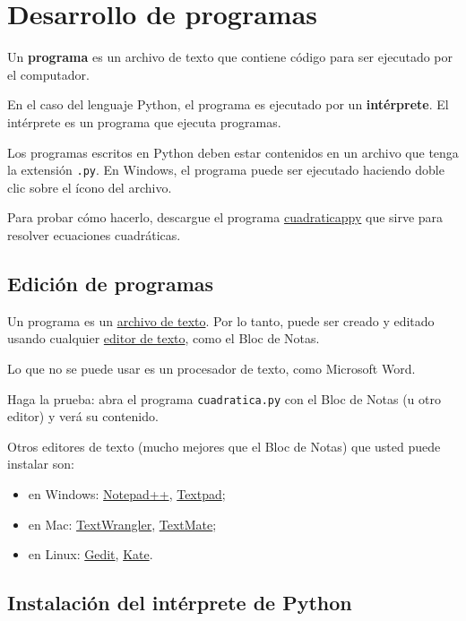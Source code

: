 \section{Desarrollo de programas}

Un \textbf{programa} es un archivo de texto que contiene código para ser
ejecutado por el computador.

En el caso del lenguaje Python, el programa es ejecutado por un
\textbf{intérprete}. El intérprete es un programa que ejecuta programas.

Los programas escritos en Python deben estar contenidos en un archivo
que tenga la extensión \lstinline!.py!. En Windows, el programa puede
ser ejecutado haciendo doble clic sobre el ícono del archivo.

Para probar cómo hacerlo, descargue el programa
\href{../\_static/programas/cuadratica.py}{cuadraticappy} que sirve para
resolver ecuaciones cuadráticas.

\subsection{Edición de programas}

Un programa es un
\href{http://es.wikipedia.org/wiki/Archivo\_de\_texto}{archivo de
texto}. Por lo tanto, puede ser creado y editado usando cualquier
\href{http://es.wikipedia.org/wiki/Editor\_de\_texto}{editor de texto},
como el Bloc de Notas.

Lo que no se puede usar es un procesador de texto, como Microsoft Word.

Haga la prueba: abra el programa \lstinline!cuadratica.py! con el Bloc
de Notas (u otro editor) y verá su contenido.

Otros editores de texto (mucho mejores que el Bloc de Notas) que usted
puede instalar son:

\begin{itemize}
\item
  en Windows: \href{http://notepad-plus-plus.org/}{Notepad++},
  \href{http://www.textpad.com/}{Textpad};
\item
  en Mac:
  \href{http://www.barebones.com/products/textwrangler/}{TextWrangler},
  \href{http://macromates.com/}{TextMate};
\item
  en Linux: \href{http://projects.gnome.org/gedit/}{Gedit},
  \href{http://kate-editor.org/}{Kate}.
\end{itemize}

\subsection{Instalación del intérprete de Python}

